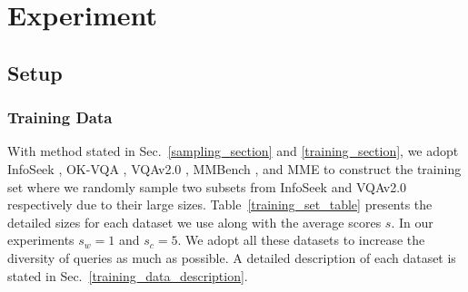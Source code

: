\section{Experiment}

\subsection{Setup}

\subsubsection{Training Data}
\label{training_time_section}

With method stated in Sec.~\ref{sampling_section} and \ref{training_section}, we adopt InfoSeek \cite{chen2023can}, OK-VQA \cite{marino2019ok}, VQAv2.0 \cite{goyal2017making}, MMBench \cite{liu2025mmbench}, and MME \cite{fu2023mme} to construct the training set where we randomly sample two subsets from InfoSeek and VQAv2.0 respectively due to their large sizes. Table~\ref{training_set_table} presents the detailed sizes for each dataset we use along with the average scores $s$. In our experiments $s_w=1$ and $s_c=5$. We adopt all these datasets to increase the diversity of queries as much as possible. A detailed description of each dataset is stated in Sec.~\ref{training_data_description}.






